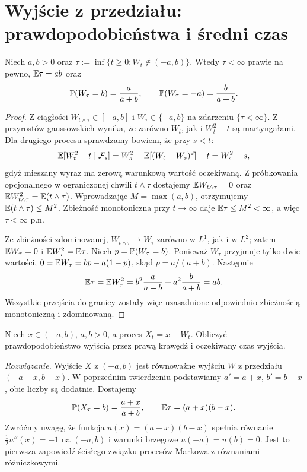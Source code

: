 \section{Wyjście z przedziału: prawdopodobieństwa i średni czas}
\begin{twierdzenie}
Niech $a,b>0$ oraz
$\tau:=\inf\{t\ge0:W_t\notin(-a,b)\}$.
Wtedy $\tau<\infty$ prawie na pewno,
$\mathbb{E}\tau=ab$ oraz
\[
\mathbb{P}(W_\tau=b)=\frac{a}{a+b},\qquad
\mathbb{P}(W_\tau=-a)=\frac{b}{a+b}.
\]
\end{twierdzenie}
\begin{proof}
Z ciągłości $W_{t\wedge\tau}\in[-a,b]$ i
$W_\tau\in\{-a,b\}$ na zdarzeniu $\{\tau<\infty\}$.
Z przyrostów gaussowskich wynika, że zarówno $W_t$,
jak i $W_t^2-t$ są martyngałami. Dla drugiego procesu
sprawdzamy bowiem, że przy $s<t$:
\[
\mathbb{E}[W_t^2-t\mid\mathcal{F}_s]
=W_s^2+\mathbb{E}[(W_t-W_s)^2]-t=W_s^2-s,
\]
gdyż mieszany wyraz ma zerową warunkową wartość oczekiwaną.
Z próbkowania opcjonalnego w ograniczonej chwili
$t\wedge\tau$ dostajemy
$\mathbb{E} W_{t\wedge\tau}=0$ oraz
$\mathbb{E} W_{t\wedge\tau}^2=\mathbb{E}(t\wedge\tau)$.
Wprowadzając $M=\max(a,b)$, otrzymujemy
$\mathbb{E}(t\wedge\tau)\le M^2$. Zbieżność monotoniczna
przy $t\to\infty$ daje $\mathbb{E}\tau\le M^2<\infty$,
a więc $\tau<\infty$ p.n.

Ze zbieżności zdominowanej,
$W_{t\wedge\tau}\to W_\tau$ zarówno w $L^1$,
jak i w $L^2$; zatem
$\mathbb{E} W_\tau=0$ i
$\mathbb{E} W_\tau^2=\mathbb{E}\tau$.
Niech $p=\mathbb{P}(W_\tau=b)$. Ponieważ
$W_\tau$ przyjmuje tylko dwie wartości,
$0=\mathbb{E} W_\tau=bp-a(1-p)$, skąd $p=a/(a+b)$.
Następnie
\[
\mathbb{E}\tau=\mathbb{E} W_\tau^2
=b^2\frac{a}{a+b}+a^2\frac{b}{a+b}=ab.
\]
Wszystkie przejścia do granicy zostały więc uzasadnione
odpowiednio zbieżnością monotoniczną i zdominowaną.
\end{proof}

\begin{zadanie}
Niech $x\in(-a,b)$, $a,b>0$, a proces
$X_t=x+W_t$. Obliczyć prawdopodobieństwo wyjścia
przez prawą krawędź i oczekiwany czas wyjścia.

\emph{Rozwiązanie.} Wyjście $X$ z $(-a,b)$ jest
równoważne wyjściu $W$ z przedziału
$(-a-x,b-x)$. W poprzednim twierdzeniu podstawiamy
$a'=a+x$, $b'=b-x$, obie liczby są dodatnie. Dostajemy
\[
\mathbb{P}(X_\tau=b)=\frac{a+x}{a+b},\qquad
\mathbb{E}\tau=(a+x)(b-x).
\]
Zwróćmy uwagę, że funkcja $u(x)=(a+x)(b-x)$
spełnia równanie $\frac12u''(x)=-1$ na $(-a,b)$
i warunki brzegowe $u(-a)=u(b)=0$.
Jest to pierwsza zapowiedź ścisłego związku procesów
Markowa z równaniami różniczkowymi.
\end{zadanie}

